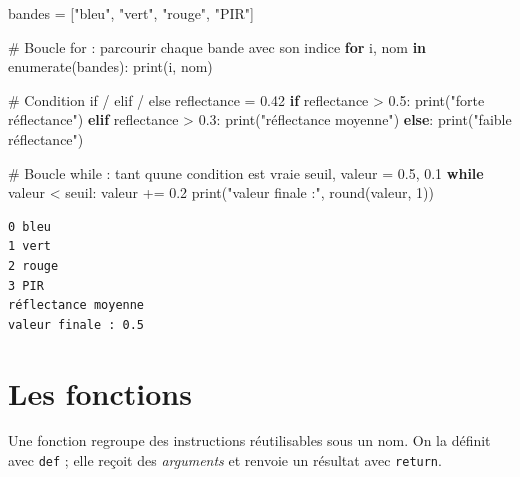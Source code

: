 \documentclass[
  french,
  11pt,
  letterpaper,
  open=any,
  twoside=false,
  french]{scrbook}
\newenvironment{Shaded}{\begin{snugshade}}{\end{snugshade}}
\newcommand{\BuiltInTok}[1]{\textcolor[rgb]{0.00,0.23,0.31}{#1}}
\newcommand{\CommentTok}[1]{\textcolor[rgb]{0.37,0.37,0.37}{#1}}
\newcommand{\ControlFlowTok}[1]{\textcolor[rgb]{0.00,0.23,0.31}{\textbf{#1}}}
\newcommand{\DecValTok}[1]{\textcolor[rgb]{0.68,0.00,0.00}{#1}}
\newcommand{\FloatTok}[1]{\textcolor[rgb]{0.68,0.00,0.00}{#1}}
\newcommand{\KeywordTok}[1]{\textcolor[rgb]{0.00,0.23,0.31}{\textbf{#1}}}
\newcommand{\NormalTok}[1]{\textcolor[rgb]{0.00,0.23,0.31}{#1}}
\newcommand{\OperatorTok}[1]{\textcolor[rgb]{0.37,0.37,0.37}{#1}}
\newcommand{\StringTok}[1]{\textcolor[rgb]{0.13,0.47,0.30}{#1}}
\begin{document}
\begin{Shaded}
\begin{Highlighting}[]
\NormalTok{bandes }\OperatorTok{=}\NormalTok{ [}\StringTok{"bleu"}\NormalTok{, }\StringTok{"vert"}\NormalTok{, }\StringTok{"rouge"}\NormalTok{, }\StringTok{"PIR"}\NormalTok{]}

\CommentTok{\# Boucle for : parcourir chaque bande avec son indice}
\ControlFlowTok{for}\NormalTok{ i, nom }\KeywordTok{in} \BuiltInTok{enumerate}\NormalTok{(bandes):}
    \BuiltInTok{print}\NormalTok{(i, nom)}

\CommentTok{\# Condition if / elif / else}
\NormalTok{reflectance }\OperatorTok{=} \FloatTok{0.42}
\ControlFlowTok{if}\NormalTok{ reflectance }\OperatorTok{\textgreater{}} \FloatTok{0.5}\NormalTok{:}
    \BuiltInTok{print}\NormalTok{(}\StringTok{"forte réflectance"}\NormalTok{)}
\ControlFlowTok{elif}\NormalTok{ reflectance }\OperatorTok{\textgreater{}} \FloatTok{0.3}\NormalTok{:}
    \BuiltInTok{print}\NormalTok{(}\StringTok{"réflectance moyenne"}\NormalTok{)}
\ControlFlowTok{else}\NormalTok{:}
    \BuiltInTok{print}\NormalTok{(}\StringTok{"faible réflectance"}\NormalTok{)}

\CommentTok{\# Boucle while : tant qu\textquotesingle{}une condition est vraie}
\NormalTok{seuil, valeur }\OperatorTok{=} \FloatTok{0.5}\NormalTok{, }\FloatTok{0.1}
\ControlFlowTok{while}\NormalTok{ valeur }\OperatorTok{\textless{}}\NormalTok{ seuil:}
\NormalTok{    valeur }\OperatorTok{+=} \FloatTok{0.2}
\BuiltInTok{print}\NormalTok{(}\StringTok{"valeur finale :"}\NormalTok{, }\BuiltInTok{round}\NormalTok{(valeur, }\DecValTok{1}\NormalTok{))}
\end{Highlighting}
\end{Shaded}

\begin{verbatim}
0 bleu
1 vert
2 rouge
3 PIR
réflectance moyenne
valeur finale : 0.5
\end{verbatim}

\section{Les fonctions}\label{les-fonctions}

Une fonction regroupe des instructions réutilisables sous un nom. On la
définit avec \texttt{def} ; elle reçoit des \emph{arguments} et renvoie
un résultat avec \texttt{return}.
\end{document}
